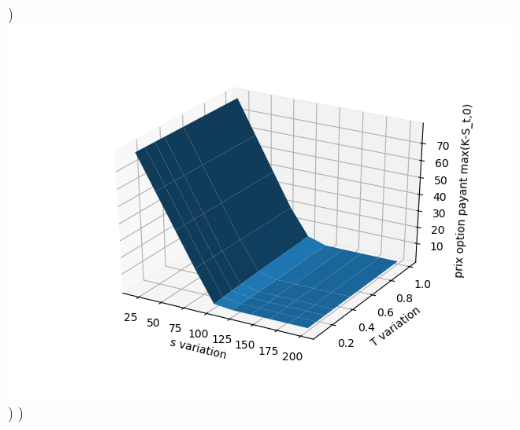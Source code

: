 \documentclass{exam}
\begin{document}
\newline
{}) \includegraphics{question18.png}
\newline
{})
\newline
{})
\end{document}

